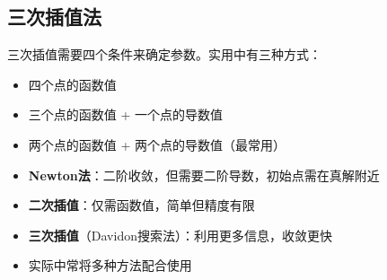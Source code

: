\subsection{三次插值法}

三次插值需要四个条件来确定参数。实用中有三种方式：
\begin{itemize}
    \item 四个点的函数值
    \item 三个点的函数值 + 一个点的导数值
    \item 两个点的函数值 + 两个点的导数值（最常用）
\end{itemize}

\begin{notebox}[方法比较]
\begin{itemize}[itemsep=0.3em]
    \item \textbf{Newton法}：二阶收敛，但需要二阶导数，初始点需在真解附近
    \item \textbf{二次插值}：仅需函数值，简单但精度有限
    \item \textbf{三次插值}（Davidon搜索法）：利用更多信息，收敛更快
    \item 实际中常将多种方法配合使用
\end{itemize}
\end{notebox}

